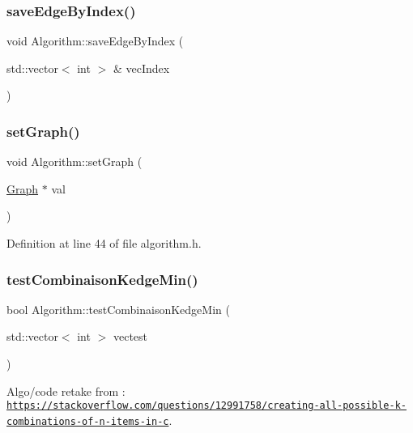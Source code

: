 \subsubsection{\texorpdfstring{save\+Edge\+By\+Index()}{saveEdgeByIndex()}}
{\footnotesize\ttfamily void Algorithm\+::save\+Edge\+By\+Index (\begin{DoxyParamCaption}\item[{std\+::vector$<$ int $>$ \&}]{vec\+Index }\end{DoxyParamCaption})}

\mbox{\label{struct_algorithm_aa02d10ce76cebfcb8dbca2596181d196}} 
\subsubsection{\texorpdfstring{set\+Graph()}{setGraph()}}
{\footnotesize\ttfamily void Algorithm\+::set\+Graph (\begin{DoxyParamCaption}\item[{\mbox{\hyperlink{class_graph}{Graph}} $\ast$}]{val }\end{DoxyParamCaption})\hspace{0.3cm}{\ttfamily [inline]}}



Definition at line 44 of file algorithm.\+h.

\mbox{\label{struct_algorithm_a7ada217d91dc5b83c84c851ec4441433}} 
\subsubsection{\texorpdfstring{test\+Combinaison\+Kedge\+Min()}{testCombinaisonKedgeMin()}}
{\footnotesize\ttfamily bool Algorithm\+::test\+Combinaison\+Kedge\+Min (\begin{DoxyParamCaption}\item[{std\+::vector$<$ int $>$}]{vectest }\end{DoxyParamCaption})}



Algo/code retake from \+: \href{https://stackoverflow.com/questions/12991758/creating-all-possible-k-combinations-of-n-items-in-c}{\tt https\+://stackoverflow.\+com/questions/12991758/creating-\/all-\/possible-\/k-\/combinations-\/of-\/n-\/items-\/in-\/c}. 

